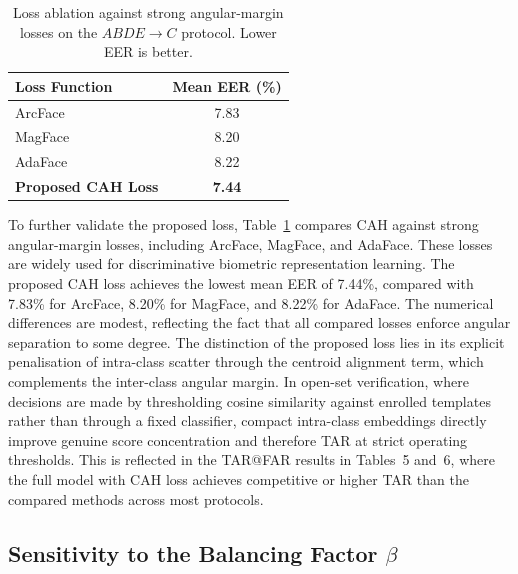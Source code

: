 \documentclass[10pt,journal,compsoc]{IEEEtran}
\begin{document}
\begin{table}[ht!]
    \centering
    \begin{tabular}{|l|c|}
        \hline
        Loss Function & Mean EER (\%) \\
        \hline
        ArcFace \cite{deng2019arcface} & 7.83 \\
        MagFace \cite{meng2021magface} & 8.20 \\
        AdaFace \cite{kim2022adaface} & 8.22 \\
        \textbf{Proposed CAH Loss} & \textbf{7.44} \\
        \hline
    \end{tabular}
    \caption{Loss ablation against strong angular-margin losses on the $ABDE \rightarrow C$ protocol. Lower EER is better.}
    \label{tab:rebuttal_loss_ablation}
\end{table}

To further validate the proposed loss, Table~\ref{tab:rebuttal_loss_ablation} compares CAH against strong angular-margin losses, including ArcFace, MagFace, and AdaFace. These losses are widely used for discriminative biometric representation learning.
The proposed CAH loss achieves the lowest mean EER of 7.44\%,
compared with 7.83\% for ArcFace, 8.20\% for MagFace, and
8.22\% for AdaFace. The numerical differences are modest,
reflecting the fact that all compared losses enforce angular
separation to some degree. The distinction of the proposed
loss lies in its explicit penalisation of intra-class scatter
through the centroid alignment term, which complements the
inter-class angular margin. In open-set verification, where
decisions are made by thresholding cosine similarity against
enrolled templates rather than through a fixed classifier,
compact intra-class embeddings directly improve genuine score
concentration and therefore TAR at strict operating thresholds.
This is reflected in the TAR@FAR results in Tables~5 and~6,
where the full model with CAH loss achieves competitive or
higher TAR than the compared methods across most protocols.

\subsection{Sensitivity to the Balancing Factor $\beta$}
\end{document}
